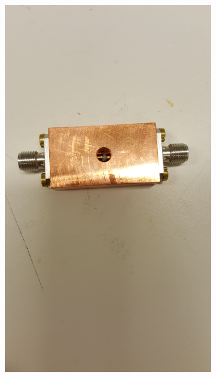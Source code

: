 \documentclass[main.tex]{subfiles}
\begin{document}
\begin{figure}[h]
\begin{subfigure}{0.329\textwidth}
        \includegraphics[angle=-90,trim=1000 100 2000 100,clip,width=0.97\linewidth]{figure/Filterbilder/filter_before_solder.jpg} 
        \caption{}
        \label{fig:before_solder}
    \end{subfigure}
    \begin{subfigure}{0.329\textwidth}
        \centering

\end{subfigure}
\end{figure}
\end{document}
